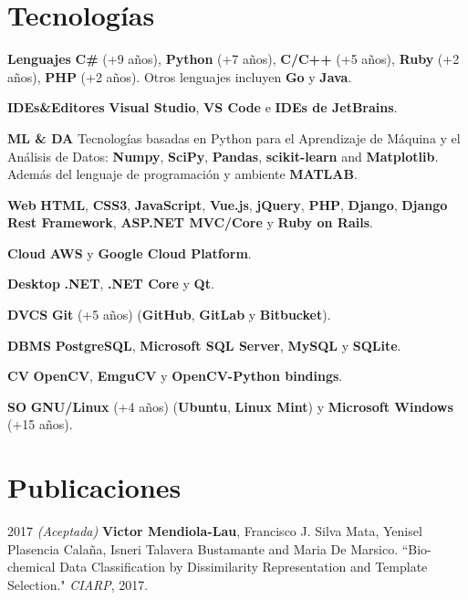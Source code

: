 \documentclass[]{friggeri-cv}
\begin{document}
\section{Tecnologías}
\begin{entrylist}
  \entry
    {\textbf{Lenguajes}}
    {}
    {}
    {\textbf{C\#} (+9 años), \textbf{Python} (+7 años), \textbf{C/C++} (+5 años), \textbf{Ruby} (+2 años), \textbf{PHP} (+2 años). Otros lenguajes incluyen \textbf{Go} y \textbf{Java}.}
\end{entrylist}

\begin{entrylist}
  \entry
    {\textbf{IDEs\&Editores}}
    {}
    {}
    {\textbf{Visual Studio}, \textbf{VS Code} e \textbf{IDEs de JetBrains}.}

  \entry
    {\textbf{ML \& DA}}
    {}
    {}
    {Tecnologías basadas en Python para el Aprendizaje de Máquina y el Análisis de Datos: \textbf{Numpy}, \textbf{SciPy}, \textbf{Pandas}, \textbf{scikit-learn} and \textbf{Matplotlib}. Además del lenguaje de programación y ambiente \textbf{MATLAB}.}

  \entry
    {\textbf{Web}}
    {}
    {}
    {\textbf{HTML}, \textbf{CSS3}, \textbf{JavaScript}, \textbf{Vue.js}, \textbf{jQuery}, \textbf{PHP}, \textbf{Django}, \textbf{Django Rest Framework}, \textbf{ASP.NET MVC/Core} y \textbf{Ruby on Rails}.}

  \entry
    {\textbf{Cloud}}
    {}
    {}
    {\textbf{AWS} y \textbf{Google Cloud Platform}.}

  \entry
    {\textbf{Desktop}}
    {}
    {}
    {\textbf{.NET}, \textbf{.NET Core} y \textbf{Qt}.}

  \entry
    {\textbf{DVCS}}
    {}
    {}
    {\textbf{Git} (+5 años) (\textbf{GitHub}, \textbf{GitLab} y \textbf{Bitbucket}).}
    
  \entry
    {\textbf{DBMS}}
    {}
    {}
    {\textbf{PostgreSQL}, \textbf{Microsoft SQL Server}, \textbf{MySQL} y \textbf{SQLite}.}
    
  \entry
    {\textbf{CV}}
    {}
    {}
    {\textbf{OpenCV}, \textbf{EmguCV} y \textbf{OpenCV-Python bindings}.}    

  \entry
    {\textbf{SO}}
    {}
    {}
    {\textbf{GNU/Linux} (+4 años) (\textbf{Ubuntu}, \textbf{Linux Mint}) y \textbf{Microsoft Windows} (+15 años).}
\end{entrylist}

\pagebreak

\section{Publicaciones}
\begin{paperlist}
  \paperentry
    {2017}
    {}
    {}
    {
		\emph{(Aceptada)} \textbf{Victor Mendiola-Lau}, Francisco J. Silva Mata, Yenisel Plasencia Calaña, Isneri Talavera Bustamante and Maria De Marsico. ``Bio-chemical Data Classification by Dissimilarity Representation and Template Selection." \emph{CIARP}, 2017.
    }
\end{paperlist}
\end{document}
